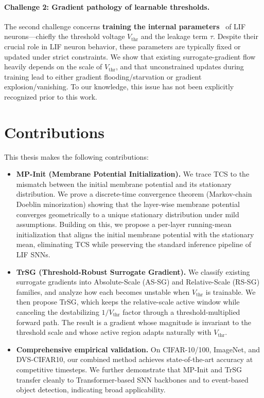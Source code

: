 \paragraph{Challenge 2: Gradient pathology of learnable thresholds.}
The second challenge concerns \textbf{training the internal parameters}~\cite{fang:2021, wang:2022, rathi:2023} of LIF neurons—chiefly the threshold voltage $V_{\text{thr}}$ and the leakage term $\tau$. Despite their crucial role in LIF neuron behavior, these parameters are typically fixed or updated under strict constraints. We show that existing surrogate-gradient flow heavily depends on the scale of $V_{\text{thr}}$, and that unconstrained updates during training lead to either gradient flooding/starvation or gradient explosion/vanishing. To our knowledge, this issue has not been explicitly recognized prior to this work.

\section{Contributions}
\label{sec:intro_contributions}

This thesis makes the following contributions:

\begin{itemize}[leftmargin=2em]
    \item \textbf{MP-Init (Membrane Potential Initialization).} We trace TCS to the mismatch between the initial membrane potential and its stationary distribution. We prove a discrete-time convergence theorem (Markov-chain Doeblin minorization) showing that the layer-wise membrane potential converges geometrically to a unique stationary distribution under mild assumptions. Building on this, we propose a per-layer running-mean initialization that aligns the initial membrane potential with the stationary mean, eliminating TCS while preserving the standard inference pipeline of LIF SNNs.

    \item \textbf{TrSG (Threshold-Robust Surrogate Gradient).} We classify existing surrogate gradients into Absolute-Scale (AS-SG) and Relative-Scale (RS-SG) families, and analyze how each becomes unstable when $V_{\text{thr}}$ is trainable. We then propose TrSG, which keeps the relative-scale active window while canceling the destabilizing $1/V_{\text{thr}}$ factor through a threshold-multiplied forward path. The result is a gradient whose magnitude is invariant to the threshold scale and whose active region adapts naturally with $V_{\text{thr}}$.

    \item \textbf{Comprehensive empirical validation.} On CIFAR-10/100, ImageNet, and DVS-CIFAR10, our combined method achieves state-of-the-art accuracy at competitive timesteps. We further demonstrate that MP-Init and TrSG transfer cleanly to Transformer-based SNN backbones and to event-based object detection, indicating broad applicability.
\end{itemize}

